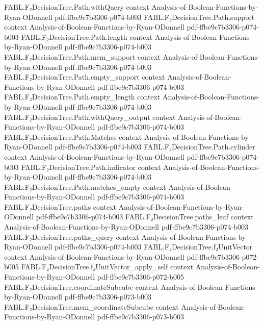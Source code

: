 \begin{theorem}
  {FABL.F₂DecisionTree.Path.withQuery}
  {context}
  {Analysis-of-Boolean-Functions-by-Ryan-ODonnell}
  {pdf-ffbe9c7b3306-p074-b003}
\proofstep
  {FABL.F₂DecisionTree.Path.support}
  {context}
  {Analysis-of-Boolean-Functions-by-Ryan-ODonnell}
  {pdf-ffbe9c7b3306-p074-b003}
\proofstep
  {FABL.F₂DecisionTree.Path.length}
  {context}
  {Analysis-of-Boolean-Functions-by-Ryan-ODonnell}
  {pdf-ffbe9c7b3306-p074-b003}
\proofstep
  {FABL.F₂DecisionTree.Path.mem_support}
  {context}
  {Analysis-of-Boolean-Functions-by-Ryan-ODonnell}
  {pdf-ffbe9c7b3306-p074-b003}
\proofstep
  {FABL.F₂DecisionTree.Path.empty_support}
  {context}
  {Analysis-of-Boolean-Functions-by-Ryan-ODonnell}
  {pdf-ffbe9c7b3306-p074-b003}
\proofstep
  {FABL.F₂DecisionTree.Path.empty_length}
  {context}
  {Analysis-of-Boolean-Functions-by-Ryan-ODonnell}
  {pdf-ffbe9c7b3306-p074-b003}
\proofstep
  {FABL.F₂DecisionTree.Path.withQuery_output}
  {context}
  {Analysis-of-Boolean-Functions-by-Ryan-ODonnell}
  {pdf-ffbe9c7b3306-p074-b003}
\proofstep
  {FABL.F₂DecisionTree.Path.Matches}
  {context}
  {Analysis-of-Boolean-Functions-by-Ryan-ODonnell}
  {pdf-ffbe9c7b3306-p074-b003}
\proofstep
  {FABL.F₂DecisionTree.Path.cylinder}
  {context}
  {Analysis-of-Boolean-Functions-by-Ryan-ODonnell}
  {pdf-ffbe9c7b3306-p074-b003}
\proofstep
  {FABL.F₂DecisionTree.Path.indicator}
  {context}
  {Analysis-of-Boolean-Functions-by-Ryan-ODonnell}
  {pdf-ffbe9c7b3306-p074-b003}
\proofstep
  {FABL.F₂DecisionTree.Path.matches_empty}
  {context}
  {Analysis-of-Boolean-Functions-by-Ryan-ODonnell}
  {pdf-ffbe9c7b3306-p074-b003}
\proofstep
  {FABL.F₂DecisionTree.paths}
  {context}
  {Analysis-of-Boolean-Functions-by-Ryan-ODonnell}
  {pdf-ffbe9c7b3306-p074-b003}
\proofstep
  {FABL.F₂DecisionTree.paths_leaf}
  {context}
  {Analysis-of-Boolean-Functions-by-Ryan-ODonnell}
  {pdf-ffbe9c7b3306-p074-b003}
\proofstep
  {FABL.F₂DecisionTree.paths_query}
  {context}
  {Analysis-of-Boolean-Functions-by-Ryan-ODonnell}
  {pdf-ffbe9c7b3306-p074-b003}
\proofstep
  {FABL.F₂DecisionTree.f₂UnitVector}
  {context}
  {Analysis-of-Boolean-Functions-by-Ryan-ODonnell}
  {pdf-ffbe9c7b3306-p072-b005}
\proofstep
  {FABL.F₂DecisionTree.f₂UnitVector_apply_self}
  {context}
  {Analysis-of-Boolean-Functions-by-Ryan-ODonnell}
  {pdf-ffbe9c7b3306-p072-b005}
\proofstep
  {FABL.F₂DecisionTree.coordinateSubcube}
  {context}
  {Analysis-of-Boolean-Functions-by-Ryan-ODonnell}
  {pdf-ffbe9c7b3306-p073-b003}
\proofstep
  {FABL.F₂DecisionTree.mem_coordinateSubcube}
  {context}
  {Analysis-of-Boolean-Functions-by-Ryan-ODonnell}
  {pdf-ffbe9c7b3306-p073-b003}
\proofstep

\end{theorem}
